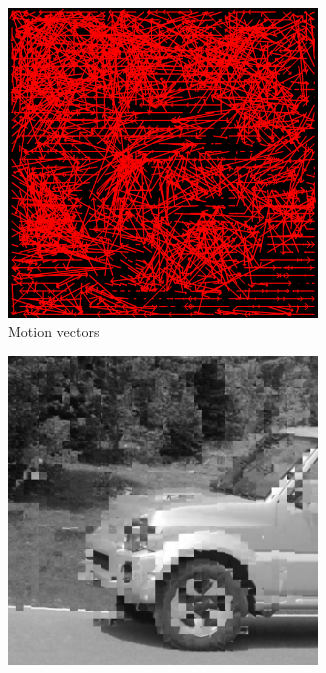 \documentclass{homework}
\begin{document}
\begin{figure}[H]
    \centering
    \begin{subfigure}{0.32\textwidth}
        \centering
        \includegraphics[width=0.9\textwidth]{8_32_TSS_motion_vectors.png}
        \caption{Motion vectors}
    \end{subfigure}
    \begin{subfigure}{0.32\textwidth}
        \centering
        \includegraphics[width=0.9\textwidth]{8_32_TSS_motion_compensation.png}

\end{subfigure}
\end{figure}
\end{document}

